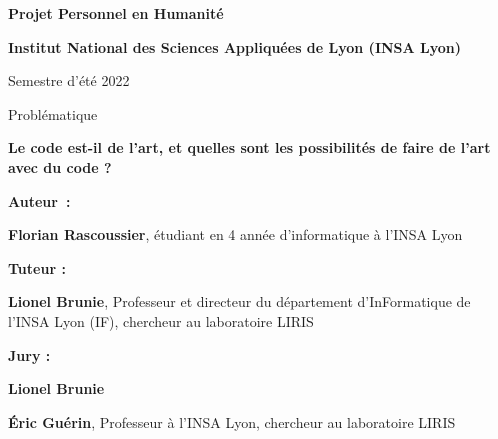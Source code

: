 \begin{titlepage}
    \begin{center}
        \vspace{1cm}
        \Large
        \textbf{Projet Personnel en Humanité}

        \vspace{0.5cm}
        \normalsize
        \textbf{Institut National des Sciences Appliquées de Lyon (INSA Lyon)}

        \normalsize
        Semestre d'été 2022

        \vspace{2cm}
        \Large
        Problématique

        \textbf{Le code est-il de l'art, et quelles sont les possibilités de faire de l'art avec du code ?}

        \vfill

        \Large
        \textbf{Auteur :} \par
        \normalsize
        \textbf{Florian Rascoussier}, étudiant en 4 année d'informatique à l'INSA Lyon

        \Large
        \textbf{Tuteur :} \par
        \normalsize
        \textbf{Lionel Brunie}, Professeur et directeur du département d'InFormatique de l'INSA Lyon (IF), chercheur au laboratoire LIRIS

        \Large
        \textbf{Jury :} \par
        \normalsize
        \textbf{Lionel Brunie}

        \textbf{Éric Guérin}, Professeur à l'INSA Lyon, chercheur au laboratoire LIRIS
            
    \end{center}
\end{titlepage}